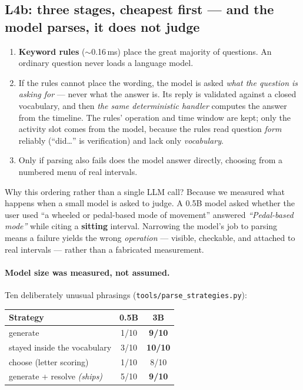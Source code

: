 \documentclass[11pt,a4paper]{article}
\newcommand{\code}[1]{\texttt{\small #1}}
\begin{document}
\subsection{L4b: three stages, cheapest first --- and the model parses, it does not judge}

\begin{enumerate}
\item \textbf{Keyword rules} ($\sim$0.16\,ms) place the great majority of questions. An
ordinary question never loads a language model.
\item If the rules cannot place the wording, the model is asked \emph{what the question
is asking for} --- never what the answer is. Its reply is validated against a closed
vocabulary, and then \emph{the same deterministic handler} computes the answer from the
timeline. The rules' operation and time window are kept; only the activity slot comes
from the model, because the rules read question \emph{form} reliably (``did\ldots'' is
verification) and lack only \emph{vocabulary}.
\item Only if parsing also fails does the model answer directly, choosing from a
numbered menu of real intervals.
\end{enumerate}

Why this ordering rather than a single LLM call? Because we measured what happens when a
small model is asked to judge. A 0.5B model asked whether the user used ``a wheeled or
pedal-based mode of movement'' answered \emph{``Pedal-based mode''} while citing a
\textbf{sitting} interval. Narrowing the model's job to parsing means a failure yields
the wrong \emph{operation} --- visible, checkable, and attached to real intervals ---
rather than a fabricated measurement.

\paragraph{Model size was measured, not assumed.} Ten deliberately unusual phrasings
(\code{tools/parse\_strategies.py}):

\begin{center}
\small
\begin{tabular}{@{}lcc@{}}
\toprule
Strategy & 0.5B & 3B \\
\midrule
generate                          & 1/10 & \textbf{9/10} \\
stayed inside the vocabulary      & 3/10 & \textbf{10/10} \\
choose (letter scoring)           & 1/10 & 8/10 \\
generate + resolve \emph{(ships)} & 5/10 & \textbf{9/10} \\
\bottomrule
\end{tabular}
\end{center}
\end{document}
